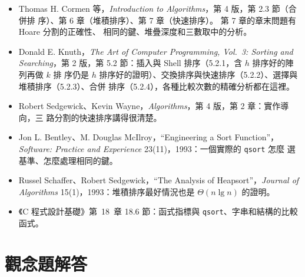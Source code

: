 \begin{itemize}
\item Thomas H. Cormen 等，\textit{Introduction to Algorithms}，第 4 版，第 2.3 節（合併排
序）、第 6 章（堆積排序）、第 7 章（快速排序）。 第 7 章的章末問題有 Hoare 分割的正確性、
相同的鍵、堆疊深度和三數取中的分析。
\item Donald E. Knuth，\textit{The Art of Computer Programming, Vol.~3: Sorting and
Searching}，第 2 版，第 5.2 節：插入與 Shell 排序（5.2.1，含 $h$ 排序好的陣列再做 $k$ 排
序仍是 $h$ 排序好的證明）、交換排序與快速排序（5.2.2）、選擇與堆積排序（5.2.3）、合併
排序（5.2.4），各種比較次數的精確分析都在這裡。
\item Robert Sedgewick、Kevin Wayne，\textit{Algorithms}，第 4 版，第 2 章：實作導向，三
路分割的快速排序講得很清楚。
\item Jon L. Bentley、M. Douglas McIlroy，``Engineering a Sort Function''，
\textit{Software: Practice and Experience} 23(11)，1993：一個實際的 \texttt{qsort} 怎麼
選基準、怎麼處理相同的鍵。
\item Russel Schaffer、Robert Sedgewick，``The Analysis of Heapsort''，\textit{Journal of
Algorithms} 15(1)，1993：堆積排序最好情況也是 $\Theta(n \lg n)$ 的證明。
\item 《C 程式設計基礎》第~18~章 18.6 節：函式指標與 \texttt{qsort}、字串和結構的比較函式。
\end{itemize}

\section*{觀念題解答}


